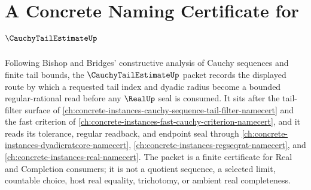 \chapter{A Concrete Naming Certificate for $\CauchyTailEstimateUp$}
\label{ch:concrete-instances-cauchy-tail-estimate-namecert}

Following Bishop and Bridges' constructive analysis of Cauchy sequences and finite tail bounds, the $\CauchyTailEstimateUp$ packet records the displayed route by which a requested tail index and dyadic radius become a bounded regular-rational read before any $\RealUp$ seal is consumed. It sits after the tail-filter surface of \autoref{ch:concrete-instances-cauchy-sequence-tail-filter-namecert} and the fast criterion of \autoref{ch:concrete-instances-fast-cauchy-criterion-namecert}, and it reads its tolerance, regular readback, and endpoint seal through \autoref{ch:concrete-instances-dyadicratcore-namecert}, \autoref{ch:concrete-instances-regseqrat-namecert}, and \autoref{ch:concrete-instances-real-namecert}. The packet is a finite certificate for Real and Completion consumers; it is not a quotient sequence, a selected limit, countable choice, host real equality, trichotomy, or ambient real completeness.

